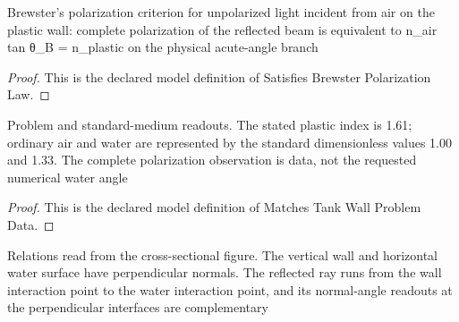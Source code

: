 \begin{definition}
  \label{def:physics:phyx-mini-0103:phyxminiproblems-problemphyxmini0103-satisfiesbrewsterpolarizationlaw}
  Brewster's polarization criterion for unpolarized light incident from air on the plastic wall: complete polarization of the reflected beam is equivalent to n\_air tan θ\_B = n\_plastic on the physical acute-angle branch
\end{definition}
\begin{proof}
  This is the declared model definition of Satisfies Brewster Polarization Law.
\end{proof}
\begin{definition}
  \label{def:physics:phyx-mini-0103:phyxminiproblems-problemphyxmini0103-matchestankwallproblemdata}
  Problem and standard-medium readouts. The stated plastic index is 1.61; ordinary air and water are represented by the standard dimensionless values 1.00 and 1.33. The complete polarization observation is data, not the requested numerical water angle
\end{definition}
\begin{proof}
  This is the declared model definition of Matches Tank Wall Problem Data.
\end{proof}
\begin{definition}
  \label{def:physics:phyx-mini-0103:phyxminiproblems-problemphyxmini0103-satisfiestankfiguregeometry}
  Relations read from the cross-sectional figure. The vertical wall and horizontal water surface have perpendicular normals. The reflected ray runs from the wall interaction point to the water interaction point, and its normal-angle readouts at the perpendicular interfaces are complementary
\end{definition}
